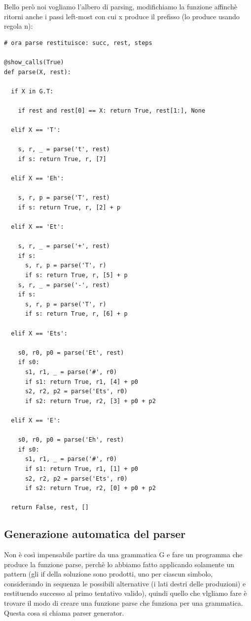 Bello però noi vogliamo l'albero di parsing, modifichiamo la funzione affinchè ritorni anche i passi left-most con cui x produce il prefisso (lo produce usando regola n):
\begin{lstlisting}
# ora parse restituisce: succ, rest, steps

@show_calls(True)
def parse(X, rest): 

  if X in G.T:

    if rest and rest[0] == X: return True, rest[1:], None

  elif X == 'T':

    s, r, _ = parse('t', rest)
    if s: return True, r, [7]

  elif X == 'Eh':

    s, r, p = parse('T', rest)
    if s: return True, r, [2] + p

  elif X == 'Et':

    s, r, _ = parse('+', rest)
    if s:
      s, r, p = parse('T', r)
      if s: return True, r, [5] + p
    s, r, _ = parse('-', rest)
    if s: 
      s, r, p = parse('T', r)
      if s: return True, r, [6] + p

  elif X == 'Ets':

    s0, r0, p0 = parse('Et', rest)
    if s0:
      s1, r1, _ = parse('#', r0)
      if s1: return True, r1, [4] + p0
      s2, r2, p2 = parse('Ets', r0)
      if s2: return True, r2, [3] + p0 + p2

  elif X == 'E':

    s0, r0, p0 = parse('Eh', rest)
    if s0:
      s1, r1, _ = parse('#', r0)
      if s1: return True, r1, [1] + p0
      s2, r2, p2 = parse('Ets', r0)
      if s2: return True, r2, [0] + p0 + p2

  return False, rest, []
\end{lstlisting}

\subsection{Generazione automatica del parser}

Non è così impensabile partire da una grammatica G e fare un programma che produce la funzione parse, perchè lo abbiamo fatto applicando solamente un pattern (gli if della soluzione sono prodotti, uno per ciascun simbolo, considerando in sequenza le possibili alternative (i lati destri delle produzioni) e restituendo successo al primo tentativo valido), quindi quello che vlgliamo fare è trovare il modo di creare una funzione parse che funziona per una grammatica. Questa cosa si chiama parser generator.

